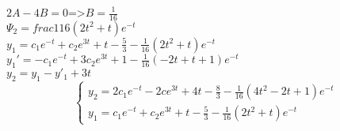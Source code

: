 \begin{Example}[алгебраическая]
$2A-4B=0$=>$B=\frac{1}{16}$\\
$\Psi_2=frac{1}{16}(2t^2+t)e^{-t}$\\
$y_1=c_1e^{-t}+c_2e^{3t}+t-\frac{5}{3}-\frac{1}{16}(2t^2+t)e^{-t}$\\
$y_1'=-c_1e^{-t}+3c_2e^{3t}+1-\frac{1}{16}(-2t+t+1)e^{-t}$\\
$y_2=y_1-y'_1+3t$\\
\[\begin{cases}
    y_2=2c_1e^{-t}-2ce^{3t}+4t-\frac{8}{3}-\frac{1}{16}(4t^2-2t+1)e^{-t}\\
    y_1=c_1e^{-t}+c_2e^{3t}+t-\frac{5}{3}-\frac{1}{16}(2t^2+t)e^{-t}
    \end{cases}\]
\end{Example}
